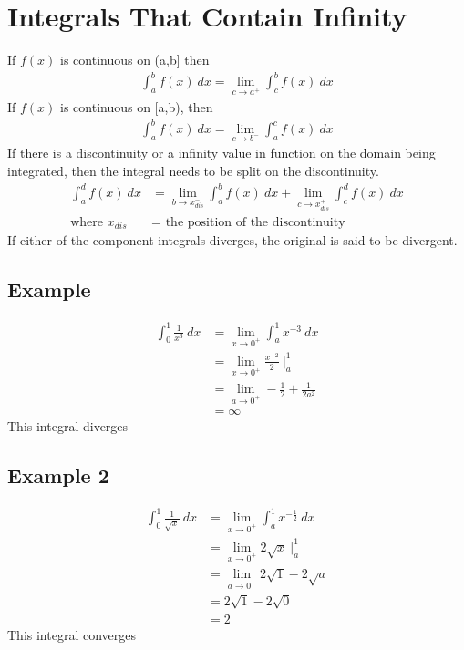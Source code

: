 \documentclass{article}
\theoremstyle{mytheoremstyle}
\theoremstyle{mytheoremstyle}
\theoremstyle{myproblemstyle}
\begin{document}
    \section*{Integrals That Contain Infinity}
    If $f(x)$ is continuous on (a,b] then 
    \begin{align*}
        \int_{a}^{b} f(x) \ dx = \lim_{c\to a^+} \int_{c}^{b} f(x) \ dx
    \end{align*}
    If $f(x)$ is continuous on [a,b), then
    \begin{align*}
        \int_{a}^{b} f(x) \ dx = \lim_{c\to b^-} \int_{a}^{c} f(x) \ dx
    \end{align*}
    If there is a discontinuity or a infinity value in function on the domain
    being integrated, then the integral needs to be split on the discontinuity.
    \begin{align*}
        \int_{a}^{d} f(x) \ dx
        &= \lim_{b\to x_{dis}^-} \int_{a}^{b} f(x) \ dx
        + \lim_{c\to x_{dis}^+} \int_{c}^{d} f(x) \ dx \\
        \text{where } x_{dis} &= \text{ the position of the discontinuity}
    \end{align*}
    If either of the component integrals diverges, the original is said to be
    divergent. 

    \subsection*{Example}
    \begin{align*}
        \int_{0}^{1} \frac{1}{x^3} \ dx
        &= \lim_{x\to 0^+} \int_{a}^{1} x^{-3} \ dx \\
        &= \lim_{x\to 0^+} \frac{x^{-2}}{2} \ \Big|_{a}^{1} \\
        &= \lim_{a\to 0^+} -\frac{1}{2} + \frac{1}{2a^2} \\
        &= \infty
    \end{align*}
    This integral diverges

    \subsection*{Example 2}
    \begin{align*}
        \int_{0}^{1} \frac{1}{\sqrt{x}} \ dx
        &= \lim_{x\to 0^+} \int_{a}^{1} x^{-\frac{1}{2}} \ dx \\
        &= \lim_{x\to 0^+} 2\sqrt{x} \ \Big|_{a}^{1} \\
        &= \lim_{a\to 0^+} 2\sqrt{1} - 2\sqrt{a} \\
        &= 2\sqrt{1} - 2\sqrt{0} \\
        &= 2
    \end{align*}
    This integral converges
\end{document}
